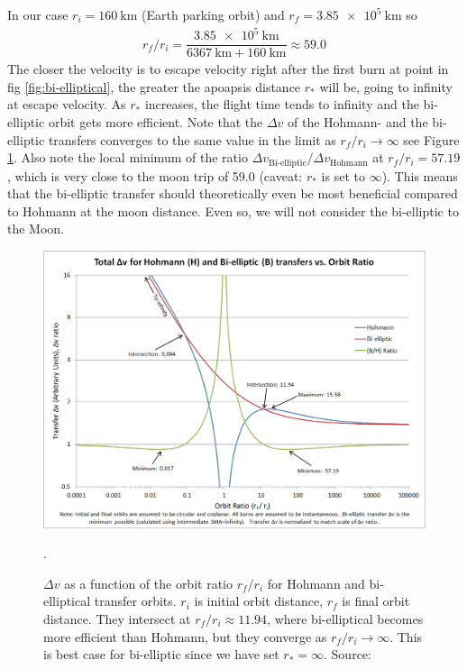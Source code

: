 In our case $r_i = \SI{160}{\km}$ (Earth parking orbit) and $r_f = \SI{3.85e5}{\km}$ so
\begin{align}
r_f/r_i = \dfrac{\SI{3.85e5}{\km}}{\SI{6367}{\km}+\SI{160}{\km}} \approx 59.0
\end{align}
The closer the velocity is to escape velocity right after the first burn at point in fig \ref{fig:bi-elliptical}, the greater the apoapsis distance $r_*$ will be, going to infinity at escape velocity. As $r_*$ increases, the flight time tends to infinity and the bi-elliptic orbit gets more efficient. Note that the $\Delta v$ of the Hohmann- and the bi-elliptic transfers converges to the same value in the limit as $r_f/r_i \to \infty$ see Figure \ref{fig:hohmann_vs_bi-elliptic1}. Also note the local minimum of the ratio $\Delta v_{\text{Bi-elliptic}}/\Delta v_{\text{Hohmann}}$ at $r_f/r_i = 57.19$, which is very close to the moon trip of 59.0 (caveat: $r_*$ is set to $\infty$). This means that the bi-elliptic transfer should theoretically even be most beneficial compared to Hohmann at the moon distance. Even so, we will not consider the bi-elliptic to the Moon.
\begin{figure}[ht]
\centering
\includegraphics[scale=.47]{fig/hohmann_vs_bi-elliptic1.png}
\caption{$\Delta v$ as a function of the orbit ratio $r_f/r_i$ for Hohmann and bi-elliptical transfer orbits. $r_i$ is initial orbit distance, $r_f$ is final orbit distance. They intersect at $r_f/r_i \approx 11.94$, where bi-elliptical becomes more efficient than Hohmann, but they converge as $r_f/r_i \to \infty$. This is best case for bi-elliptic since we have set $r_*=\infty$. Source:\cite{Copperheadtnp}}.
\label{fig:hohmann_vs_bi-elliptic1}
\end{figure}
